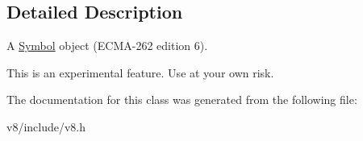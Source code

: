 \subsection{Detailed Description}
A \hyperlink{classv8_1_1Symbol}{Symbol} object (E\-C\-M\-A-\/262 edition 6).

This is an experimental feature. Use at your own risk. 

The documentation for this class was generated from the following file\-:\begin{DoxyCompactItemize}
\item 
v8/include/v8.\-h\end{DoxyCompactItemize}
